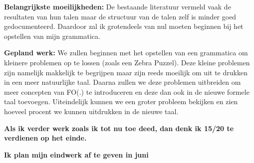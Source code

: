 \documentclass[12pt]{report}
\begin{document}
\vspace{1cm}
{\bf Belangrijkste moeilijkheden:}
De bestaande literatuur vermeld vaak de resultaten van hun talen maar de structuur van de talen zelf is minder goed gedocumenteerd. Daardoor zal ik grotendeels van nul moeten beginnen bij het opstellen van mijn grammatica.

\vspace{1cm}
{\bf Gepland werk:} 
We zullen beginnen met het opstellen van een grammatica om kleinere problemen op te lossen (zoals een Zebra Puzzel). Deze kleine problemen zijn namelijk makkelijk te begrijpen maar zijn reeds moeilijk om uit te drukken in een meer natuurlijke taal. Daarna zullen we deze problemen uitbreiden om meer concepten van FO(.) te introduceren en deze dan ook in de nieuwe formele taal toevoegen. Uiteindelijk kunnen we een groter probleem bekijken en zien hoeveel procent we kunnen uitdrukken in de nieuwe taal.


\vspace{1cm}
{\bf Als ik verder werk zoals ik tot nu toe deed, dan denk ik 15/20 te
    verdienen op het einde.}

{\bf Ik plan mijn eindwerk af te geven in juni}
\end{document}
